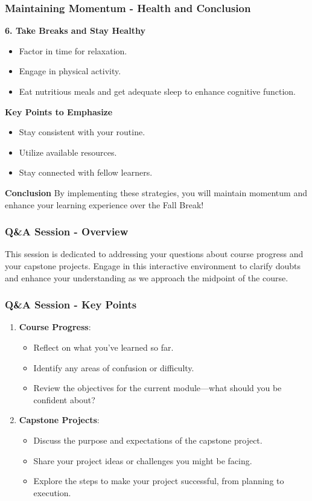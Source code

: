 \documentclass[aspectratio=169]{beamer}
\begin{document}
\begin{frame}[fragile]
    \frametitle{Maintaining Momentum - Health and Conclusion}
    \textbf{6. Take Breaks and Stay Healthy}
    \begin{itemize}
        \item Factor in time for relaxation.
        \item Engage in physical activity.
        \item Eat nutritious meals and get adequate sleep to enhance cognitive function.
    \end{itemize}
    
    \textbf{Key Points to Emphasize}
    \begin{itemize}
        \item Stay consistent with your routine.
        \item Utilize available resources.
        \item Stay connected with fellow learners.
    \end{itemize}
    
    \textbf{Conclusion}
    By implementing these strategies, you will maintain momentum and enhance your learning experience over the Fall Break!
\end{frame}

\begin{frame}[fragile]
    \frametitle{Q\&A Session - Overview}
    This session is dedicated to addressing your questions about course progress and your capstone projects. 
    Engage in this interactive environment to clarify doubts and enhance your understanding as we approach the midpoint of the course.
\end{frame}

\begin{frame}[fragile]
    \frametitle{Q\&A Session - Key Points}
    \begin{enumerate}
        \item \textbf{Course Progress}:
        \begin{itemize}
            \item Reflect on what you’ve learned so far.
            \item Identify any areas of confusion or difficulty.
            \item Review the objectives for the current module—what should you be confident about?
        \end{itemize}
        
        \item \textbf{Capstone Projects}:
        \begin{itemize}
            \item Discuss the purpose and expectations of the capstone project.
            \item Share your project ideas or challenges you might be facing.
            \item Explore the steps to make your project successful, from planning to execution.
        \end{itemize}
    \end{enumerate}
\end{frame}
\end{document}
